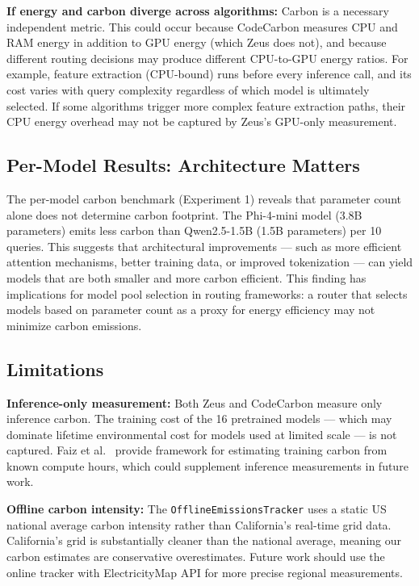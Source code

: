 \documentclass[12pt]{article}
\begin{document}
\textbf{If energy and carbon diverge across algorithms:}
Carbon is a necessary independent metric. This could occur because CodeCarbon
measures CPU and RAM energy in addition to GPU energy (which Zeus does not),
and because different routing decisions may produce different CPU-to-GPU
energy ratios. For example, feature extraction (CPU-bound) runs before every
inference call, and its cost varies with query complexity regardless of which
model is ultimately selected. If some algorithms trigger more complex feature
extraction paths, their CPU energy overhead may not be captured by Zeus's
GPU-only measurement.

\subsection{Per-Model Results: Architecture Matters}

The per-model carbon benchmark (Experiment 1) reveals that parameter count
alone does not determine carbon footprint. The Phi-4-mini model (3.8B
parameters) emits less carbon than Qwen2.5-1.5B (1.5B parameters) per 10
queries. This suggests that architectural improvements --- such as more
efficient attention mechanisms, better training data, or improved
tokenization --- can yield models that are both smaller and more carbon
efficient. This finding has implications for model pool selection in routing
frameworks: a router that selects models based on parameter count as a
proxy for energy efficiency may not minimize carbon emissions.

\subsection{Limitations}

\textbf{Inference-only measurement:} Both Zeus and CodeCarbon measure only
inference carbon. The training cost of the 16 pretrained models --- which
may dominate lifetime environmental cost for models used at limited scale
--- is not captured. Faiz et al.\ \cite{faiz2023llmcarbon} provide
framework for estimating training carbon from known compute hours, which
could supplement inference measurements in future work.

\textbf{Offline carbon intensity:} The \texttt{OfflineEmissionsTracker}
uses a static US national average carbon intensity rather than California's
real-time grid data. California's grid is substantially cleaner than the
national average, meaning our carbon estimates are conservative
overestimates. Future work should use the online tracker with
ElectricityMap API for more precise regional measurements.
\end{document}
